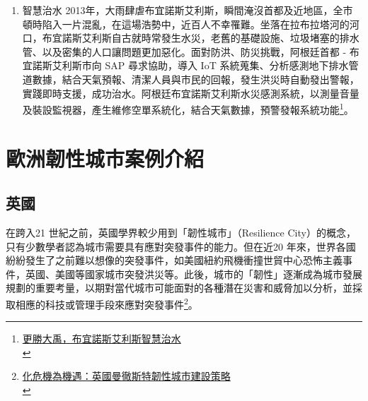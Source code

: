 \documentclass[a4paper,12pt]{article}
\begin{document}
\begin{enumerate}
\item 智慧治水
\label{sec:org2d0c3ca}
2013年，大雨肆虐布宜諾斯艾利斯，瞬間淹沒首都及近地區，全市頓時陷入一片混亂，在這場浩勢中，近百人不幸罹難。坐落在拉布拉塔河的河口，布宜諾斯艾利斯自古就時常發生水災，老舊的基礎設施、垃圾堵塞的排水管、以及密集的人口讓問題更加惡化。面對防洪、防災挑戰，阿根廷首都 - 布宜諾斯艾利斯市向 SAP 尋求協助，導入 IoT 系統蒐集、分析感測地下排水管道數據，結合天氣預報、清潔人員與市民的回報，發生洪災時自動發出警報，實踐即時支援，成功治水。阿根廷布宜諾斯艾利斯水災感測系統，以測量音量及裝設監視器，產生維修空單系統化，結合天氣數據，預警發報系統功能\footnote{\href{https://www.sap.com/taiwan/assetdetail/2019/03/d6b73be6-407d-0010-87a3-c30de2ffd8ff.html}{更勝大禹，布宜諾斯艾利斯智慧治水}\\}。\\
\newpage
\end{enumerate}

\section{歐洲韌性城市案例介紹}
\label{sec:org1b58700}
\subsection{英國}
\label{sec:org429ad56}
在跨入21 世紀之前，英國學界較少用到「韌性城市」（Resilience City）的概念，只有少數學者認為城市需要具有應對突發事件的能力。但在近20 年來，世界各國紛紛發生了之前難以想像的突發事件，如美國紐約飛機衝撞世貿中心恐怖主義事件，英國、美國等國家城市突發洪災等。此後，城市的「韌性」逐漸成為城市發展規劃的重要考量，以期對當代城市可能面對的各種潛在災害和威脅加以分析，並採取相應的科技或管理手段來應對突發事件\footnote{\href{https://kknews.cc/zh-tw/world/jkga9bl.html}{化危機為機遇：英國曼徹斯特韌性城市建設策略}\\\label{orgda6e22a}}。\\
\end{document}
